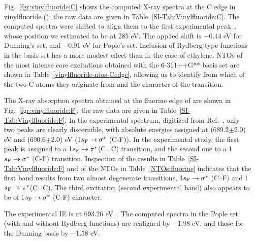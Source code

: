 \documentclass[journal=jctcce,manuscript=article]{achemso}
\begin{document}
Fig.~\ref{fgr:vinylfluoride:C} shows the computed X-ray spectra 
at the C edge in vinylfluoride (); the raw data are given in Table~\ref{SI-Tab:Vinylfluoride:C}.
The computed spectra were shifted to align them to the first experimental peak~\cite{NEXAFS_C2H4_CH2CHF_Exp}, whose position we estimated to be at 285 eV. The applied shift is $-0.44$ eV
for Dunning's set, and $-0.91$ eV for Pople's set. 
Inclusion of Rydberg-type functions in the basis set has a more 
modest effect than in the case of ethylene.
NTOs of the most intense core excitations obtained with the 6-311++G** basis set are shown in Table~\ref{vinylfluoride-ntos-Cedge}, 
allowing us to identify from which of the two C atoms they originate from and the character of the transition. 

The X-ray absorption spectra obtained at the fluorine edge of  are shown in Fig.~\ref{fgr:vinylfluoride:F}; the raw data are given in Table~\ref{SI-Tab:Vinylfluoride:F}.
In the experimental spectrum, digitized from Ref.~, only two peaks are clearly
discernible, with absolute energies assigned at (689.2$\pm$2.0) eV 
and (690.6$\pm$2.0) eV (1$s_{\rm{F}}\to \sigma^*$ (C-F)).
In the experimental study, the first peak is assigned to a 
1$s_{\rm{F}} \to \pi^*$(C=C) transition, and the second one to
a 1$s_{\rm{F}}\to \sigma^*$ (C-F) transition. Inspection of 
the results in Table~\ref{SI-Tab:Vinylfluoride:F} and of the NTOs in Table~\ref{NTOs:fluorine} indicates that 
the first band results from two almost degenerate transitions, 
1$s_{\rm{F}}\to \sigma^*$ (C--F) and 1$s_{\rm{F}} \to \pi^*$(C=C). The third excitation (second experimental band)
also appears to be of 1$s_{\rm{F}}\to \sigma^*$ (C-F) character.


The experimental IE is at 693.26 eV~\cite{jolly1984core}.
The computed spectra in the Pople set (with and without Rydberg functions) are realigned by $-1.98$ eV, and those for the Dunning basis by $-1.58$ eV. 
\end{document}
